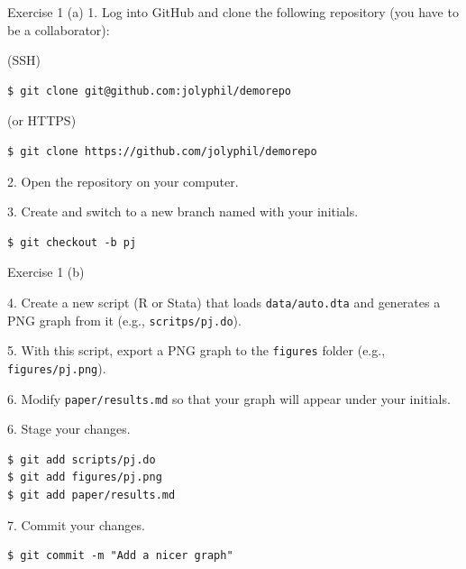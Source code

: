 \documentclass[handout]{beamer}
\begin{document}
\begin{frame}[fragile]{Exercise 1 (a)}
1. Log into GitHub and clone the following repository (you have to be a collaborator):

\vspace{0.3cm}

(SSH)
\begin{lstlisting}
$ git clone git@github.com:jolyphil/demorepo
\end{lstlisting}

(or HTTPS)
\begin{lstlisting}
$ git clone https://github.com/jolyphil/demorepo
\end{lstlisting}

2. Open the repository on your computer.

\vspace{0.3cm}

3. Create and switch to a new branch named with your initials. 

\begin{lstlisting}
$ git checkout -b pj
\end{lstlisting}

\end{frame}


\begin{frame}[fragile]{Exercise 1 (b)}

4. Create a new script (R or Stata) that loads \texttt{data/auto.dta} and generates a PNG graph from it (e.g., \texttt{scritps/pj.do}). 

\vspace{0.3cm}

5. With this script, export a PNG graph to the \texttt{figures} folder (e.g., \texttt{figures/pj.png}).

\vspace{0.3cm}

6. Modify \texttt{paper/results.md} so that your graph will appear under your initials. 

\vspace{0.3cm}

6. Stage your changes.

\begin{lstlisting}
$ git add scripts/pj.do 
$ git add figures/pj.png
$ git add paper/results.md
\end{lstlisting}

7. Commit your changes.

\begin{lstlisting}
$ git commit -m "Add a nicer graph"
\end{lstlisting}

\end{frame}
\end{document}
